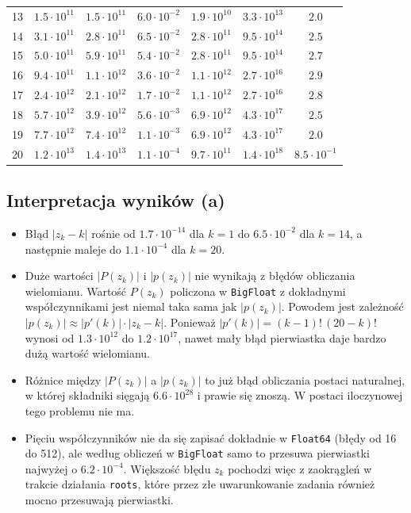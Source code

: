 \documentclass[11pt,a4paper]{article}
\begin{document}
\begin{table}[H]
\begin{tabular}{rcccccc}
13 & $1.5 \cdot 10^{11}$ & $1.5 \cdot 10^{11}$ & $6.0 \cdot 10^{-2}$ & $1.9 \cdot 10^{10}$ & $3.3 \cdot 10^{13}$ & $2.0$ \\
14 & $3.1 \cdot 10^{11}$ & $2.8 \cdot 10^{11}$ & $6.5 \cdot 10^{-2}$ & $2.8 \cdot 10^{11}$ & $9.5 \cdot 10^{14}$ & $2.5$ \\
15 & $5.0 \cdot 10^{11}$ & $5.9 \cdot 10^{11}$ & $5.4 \cdot 10^{-2}$ & $2.8 \cdot 10^{11}$ & $9.5 \cdot 10^{14}$ & $2.7$ \\
16 & $9.4 \cdot 10^{11}$ & $1.1 \cdot 10^{12}$ & $3.6 \cdot 10^{-2}$ & $1.1 \cdot 10^{12}$ & $2.7 \cdot 10^{16}$ & $2.9$ \\
17 & $2.4 \cdot 10^{12}$ & $2.1 \cdot 10^{12}$ & $1.7 \cdot 10^{-2}$ & $1.1 \cdot 10^{12}$ & $2.7 \cdot 10^{16}$ & $2.8$ \\
18 & $5.7 \cdot 10^{12}$ & $3.9 \cdot 10^{12}$ & $5.6 \cdot 10^{-3}$ & $6.9 \cdot 10^{12}$ & $4.3 \cdot 10^{17}$ & $2.5$ \\
19 & $7.7 \cdot 10^{12}$ & $7.4 \cdot 10^{12}$ & $1.1 \cdot 10^{-3}$ & $6.9 \cdot 10^{12}$ & $4.3 \cdot 10^{17}$ & $2.0$ \\
20 & $1.2 \cdot 10^{13}$ & $1.4 \cdot 10^{13}$ & $1.1 \cdot 10^{-4}$ & $9.7 \cdot 10^{11}$ & $1.4 \cdot 10^{18}$ & $8.5 \cdot 10^{-1}$ \\
\bottomrule
\end{tabular}
\end{table}

\subsection*{Interpretacja wyników (a)}
\begin{itemize}
    \item Błąd $|z_k - k|$ rośnie od $1.7 \cdot 10^{-14}$ dla $k = 1$ do $6.5 \cdot 10^{-2}$ dla $k = 14$, a następnie maleje do $1.1 \cdot 10^{-4}$ dla $k = 20$.
    \item Duże wartości $|P(z_k)|$ i $|p(z_k)|$ nie wynikają z błędów obliczania wielomianu. Wartość $P(z_k)$ policzona w \texttt{BigFloat} z dokładnymi współczynnikami jest niemal taka sama jak $|p(z_k)|$. Powodem jest zależność $|p(z_k)| \approx |p'(k)| \cdot |z_k - k|$. Ponieważ $|p'(k)| = (k-1)!\,(20-k)!$ wynosi od $1.3 \cdot 10^{12}$ do $1.2 \cdot 10^{17}$, nawet mały błąd pierwiastka daje bardzo dużą wartość wielomianu.
    \item Różnice między $|P(z_k)|$ a $|p(z_k)|$ to już błąd obliczania postaci naturalnej, w której składniki sięgają $6.6 \cdot 10^{28}$ i prawie się znoszą. W postaci iloczynowej tego problemu nie ma.
    \item Pięciu współczynników nie da się zapisać dokładnie w \texttt{Float64} (błędy od 16 do 512), ale według obliczeń w \texttt{BigFloat} samo to przesuwa pierwiastki najwyżej o $6.2 \cdot 10^{-4}$. Większość błędu $z_k$ pochodzi więc z zaokrągleń w trakcie działania \texttt{roots}, które przez złe uwarunkowanie zadania również mocno przesuwają pierwiastki.
\end{itemize}
\end{document}
